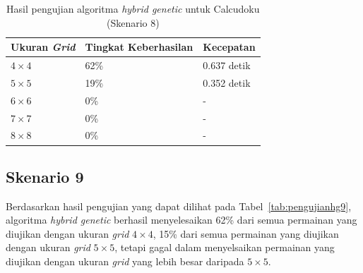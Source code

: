 \begin{table}
\centering
\captionsetup{justification=centering}
\caption[Hasil pengujian algoritma \textit{hybrid genetic} untuk Calcudoku (Skenario 8)]{Hasil pengujian algoritma \textit{hybrid genetic} untuk Calcudoku (Skenario 8)}
\begin{tabular}{| l | l | l |}
\hline
Ukuran \textit{Grid} & Tingkat Keberhasilan & Kecepatan \\
\hline \hline
\begin{math}4 \times 4\end{math} & 62\% & 0.637 detik \\
\hline
\begin{math}5 \times 5\end{math} & 19\% & 0.352 detik \\
\hline
\begin{math}6 \times 6\end{math} & 0\% & - \\
\hline
\begin{math}7 \times 7\end{math} & 0\% & - \\
\hline
\begin{math}8 \times 8\end{math} & 0\% & - \\
\hline
\end{tabular}
\label{tab:pengujianhg8}
\end{table}

\subsection{Skenario 9}
\label{sec:skenario9}

Berdasarkan hasil pengujian yang dapat dilihat pada Tabel~\ref{tab:pengujianhg9}, algoritma \textit{hybrid genetic} berhasil menyelesaikan 62\% dari semua permainan yang diujikan dengan ukuran \textit{grid} \begin{math}4 \times 4\end{math}, 15\% dari semua permainan yang diujikan dengan ukuran \textit{grid} \begin{math}5 \times 5\end{math}, tetapi gagal dalam menyelsaikan permainan yang diujikan dengan ukuran \textit{grid} yang lebih besar daripada \begin{math}5 \times 5\end{math}.

